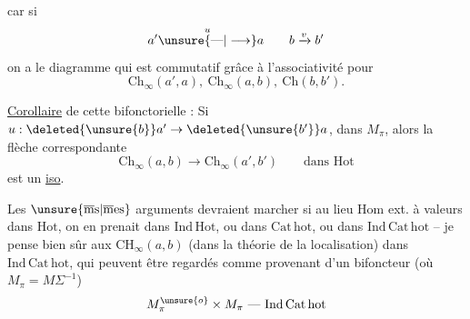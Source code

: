 car si
\[
a'\overset{u}{\unsure{\text{---}|\longrightarrow}}a\qquad b\xrightarrow{v}b'
\]
on a le diagramme
qui est commutatif grâce à l'associativité pour
\[
\mathrm{Ch}_{\infty}(a',a),\ \mathrm{Ch}_{\infty}(a,b),\ \mathrm{Ch}(b,b').
\]

\uline{Corollaire} de cette  bifonctorielle : Si $u:\deleted{\unsure{b}}a'\to\deleted{\unsure{b'}}a$,    dans $M_{\pi}$, alors la flèche correspondante
\[
\mathrm{Ch}_{\infty}(a,b)\longrightarrow\mathrm{Ch}_{\infty}(a',b')\qquad\text{dans Hot}
\]
est un \uline{iso}.

Les $\unsure{\overline{\mathrm m}\mathrm s|\overline{\mathrm m}\mathrm e\mathrm s}$ arguments devraient marcher si au lieu  $\mathrm{Hom}$ ext. à valeurs dans $\mathrm{Hot}$, on en prenait dans $\mathrm{Ind}\,\mathrm{Hot}$, ou dans $\mathrm{Cat}\,\mathrm{hot}$, ou dans $\mathrm{Ind}\,\mathrm{Cat}\,\mathrm{hot}$ -- je pense bien sûr aux $\mathrm{CH}_{\infty}(a,b)$ (dans la théorie de la localisation) dans $\mathrm{Ind}\,\mathrm{Cat}\,\mathrm{hot}$, qui  peuvent être regardés comme provenant d'un bifoncteur (où $M_{\pi}=M\Sigma^{-1}$)
\[
M_{\pi}^{\unsure{o}}\times M_{\pi}\ \text{---}\ \mathrm{Ind}\,\mathrm{Cat}\,\mathrm{hot}
\]

